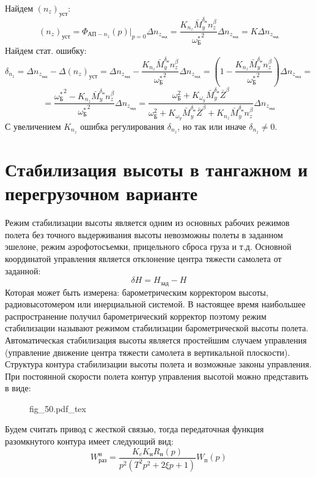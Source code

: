 \documentclass{article}
\newcommand{\incfig}[1]{
    {#1.pdf_tex}
}
\begin{document}
Найдем $(n_z)_\text{уст}$:
\[
	(n_z)_\text{уст} = \Phi_{\text{АП}-n_z}(p) |_{p=0} \Delta n_{z_\text{зад}}
	=\frac{K_{n_z} \bar{M}_y^{\delta_\text{н}}
	n_z^\beta}{{\omega_\text{Б}^*}^2} \Delta n_{z_\text{зад}} = K \Delta
	n_{z_\text{зад}}
\]
Найдем стат. ошибку:
\[
	\delta_{n_z} = \Delta n_{z_\text{зад}} - \Delta (n_z)_\text{уст} = \Delta
	n_{z_\text{зад}} - \frac{K_{n_z}
	\bar{M}_y^{\delta_\text{н}}n_z^\beta}{{\omega_\text{Б}^*}^2} \Delta
	n_{z_\text{зад}} = \left( 1 - \frac{ K_{n_z} \bar{M}_y^{\delta_\text{н}}
		n_z^\beta}{{\omega_\text{Б}^*}^2} \right) \Delta n_{z_\text{зад}} =
\]
\[
	= \frac{{\omega_\text{Б}^*}^2 - K_{n_z} \bar{M}_y^{\delta_\text{н}}
	n_z^\beta}{ {\omega_\text{Б}^*}^2} \Delta n_{z_\text{зад}} =
	\frac{\omega_\text{Б}^2 + K_{\omega_y} \bar{M}_y^{\delta_\text{н}}
	\bar{Z}^\beta}{\omega_\text{Б}^2 + K_{\omega_y} \bar{M}_y^{\delta_\text{н}}
	\bar{Z}^\beta + K_{n_z} \bar{M}_y^{\delta_\text{н}} n_z^\beta} \Delta
	n_{z_\text{зад}}
\]
С увеличением $K_{n_z}$ ошибка регулирования $\delta_{n_z}$, но так или иначе
$\delta_{n_z} \neq 0$.

\section{Стабилизация высоты в тангажном и перегрузочном варианте}
Режим стабилизации высоты является одним из основных рабочих режимов полета без
точного выдерживания высоты невозможны полеты в заданном эшелоне, режим
аэрофотосъемки, прицельного сброса груза и т.д. Основной координатой управления
является отклонение центра тяжести самолета от заданной:
\[
	\delta H = H_\text{зад} - H
\]
Которая может быть измерена: барометрическим корректором высоты,
радиовысотомером или инерциальной системой. В настоящее время наибольшее
распространение получил барометрический корректор поэтому режим стабилизации
называют режимом стабилизации барометрической высоты полета. Автоматическая
стабилизация высоты является простейшим случаем управления (управление движение
центра тяжести самолета в вертикальной плоскости). Структура контура
стабилизации высоты полета и возможные законы управления. При постоянной
скорости полета контур управления высотой можно представить в виде:

\begin{figure}[H]
	\centering
	\incfig{fig_50}
	\label{fig:fig_50}
\end{figure}

Будем считать привод с жесткой связью, тогда передаточная функция разомкнутого
контура имеет следующий вид:
\[
	W_\text{раз}^\text{н} =\frac{K_c K_\text{н} R_\text{н}(p)}{p^2(T^2 p^2 + 2
		\xi p + 1)}W_\text{п}(p)
\]
\end{document}
